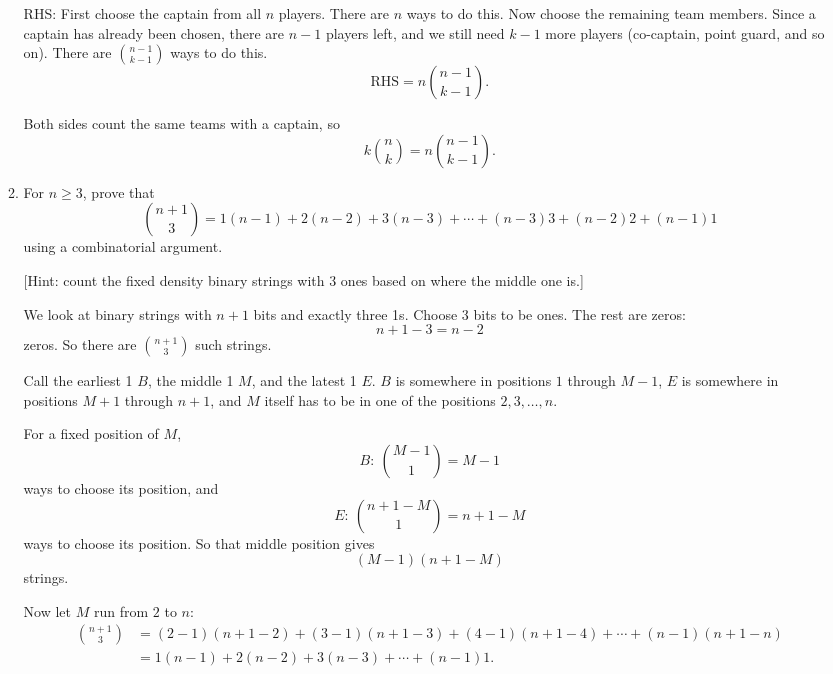 \documentclass{article}
\begin{document}
\begin{enumerate}
\begin{enumerate}
RHS:
First choose the captain from all $n$ players. There are $n$ ways to do this.
Now choose the remaining team members. Since a captain has already been chosen, there are $n-1$ players left, and we still need $k-1$ more players (co-captain, point guard, and so on).
There are $\binom{n-1}{k-1}$ ways to do this.
\[
\text{RHS} = n\binom{n-1}{k-1}.
\]

Both sides count the same teams with a captain, so
\[
k\binom{n}{k} = n\binom{n-1}{k-1}.
\]

\item For $n \geq 3$, prove that
\[
\binom{n+1}{3}
=
1(n-1) + 2(n-2) + 3(n-3) + \cdots + (n-3)3 + (n-2)2 + (n-1)1
\]
using a combinatorial argument.

[Hint: count the fixed density binary strings with 3 ones based on where the middle one is.]

We look at binary strings with $n+1$ bits and exactly three 1s.
Choose 3 bits to be ones. The rest are zeros:
\[
n+1-3 = n-2
\]
zeros. So there are $\binom{n+1}{3}$ such strings.

Call the earliest 1 $B$, the middle 1 $M$, and the latest 1 $E$.
$B$ is somewhere in positions $1$ through $M-1$, $E$ is somewhere in positions $M+1$ through $n+1$, and $M$ itself has to be in one of the positions $2, 3, \ldots, n$.

For a fixed position of $M$,
\[
B:\ \binom{M-1}{1} = M-1
\]
ways to choose its position, and
\[
E:\ \binom{n+1-M}{1} = n+1-M
\]
ways to choose its position. So that middle position gives
\[
(M-1)(n+1-M)
\]
strings.

Now let $M$ run from $2$ to $n$:
\begin{align*}
\binom{n+1}{3}
&= (2-1)(n+1-2) + (3-1)(n+1-3) + (4-1)(n+1-4) + \cdots + (n-1)(n+1-n) \\
&= 1(n-1) + 2(n-2) + 3(n-3) + \cdots + (n-1)1.
\end{align*}

\end{enumerate}

\end{enumerate}
\end{document}
